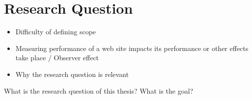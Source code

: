 














\section{Research Question}

\begin{itemize}
\item Difficulty of defining scope
\item Measuring performance of a web site impacts its performance or other effects take place / Observer effect
\item Why the research question is relevant
\end{itemize}

What is the research question of this thesis?
What is the goal?

























